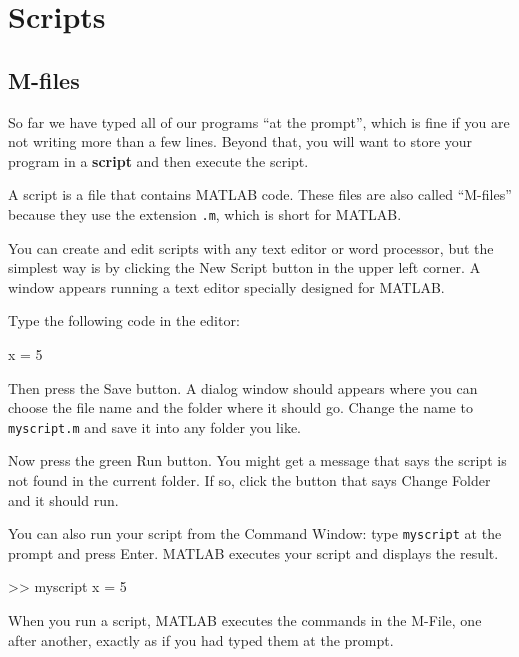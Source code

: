 \documentclass[
]{book}
\numberwithin{Answer}{chapter}
\numberwithin{Exercise}{chapter}
\begin{document}
\chapter{Scripts}

\section{M-files}
\label{sect:M-files}

So far we have typed all of our programs ``at the prompt'', which is
fine if you are not writing more than a few lines.  Beyond that,
you will want to store your program in a {\bf script} and then
execute the script.


A script is a file that contains MATLAB code.  These files are
also called ``M-files'' because they use the extension {\tt .m},
which is short for MATLAB.

You can create and edit scripts with any text editor or word processor, but the simplest way is by clicking the {\sf New Script} button in the upper left corner.  A window appears running a text editor specially designed for MATLAB.

Type the following code in the editor:

\begin{code}
x = 5
\end{code}

Then press the {\sf Save} button.  A dialog window should appears where you
can choose the file name and the folder where it should go.  Change
the name to {\tt myscript.m} and save it into any folder you like.

Now press the green {\sf Run} button.  You might get a message that says the script is not found in the current folder.  
If so, click the button that says {\sf Change Folder} and it should run.


You can also run your script from the Command Window: type {\tt myscript} at the prompt and press Enter.  
MATLAB executes your script and displays the result.

\begin{code}
>> myscript
x = 5
\end{code}

When you run a script, MATLAB executes the commands in the M-File, one
after another, exactly as if you had typed them at the prompt.
\end{document}
